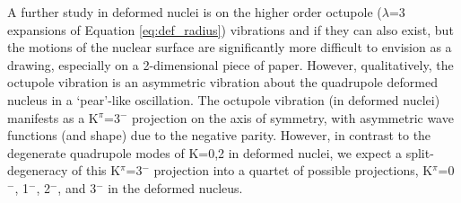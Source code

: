 A further study in deformed nuclei is on the higher order octupole ($\lambda$=3 expansions of Equation \ref{eq:def_radius}) vibrations and if they can also exist, but the motions of the nuclear surface are significantly more difficult to envision as a drawing, especially on a 2-dimensional piece of paper. However, qualitatively, the octupole vibration is an asymmetric vibration about the quadrupole deformed nucleus in a `pear'-like oscillation. The octupole vibration (in deformed nuclei) manifests as a K$^\pi$=3$^-$ projection on the axis of symmetry, with asymmetric wave functions (and shape) due to the negative parity. However, in contrast to the degenerate quadrupole modes of K=0,2 in deformed nuclei, we expect a split-degeneracy of this K$^\pi$=3$^-$ projection into a quartet of possible projections, K$^\pi$=0$^-$, 1$^-$, 2$^-$, and 3$^-$ \cite{BohrMott_text} in the deformed nucleus.


